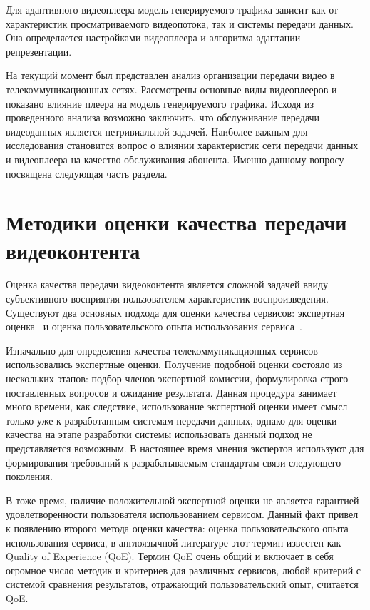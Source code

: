 Для адаптивного видеоплеера модель генерируемого трафика зависит как от характеристик просматриваемого видеопотока, так и системы передачи данных. Она определяется настройками видеоплеера и алгоритма адаптации репрезентации.

На текущий момент был представлен анализ организации передачи видео в телекоммуникационных сетях. Рассмотрены основные виды видеоплееров и показано влияние плеера на модель генерируемого трафика. Исходя из проведенного анализа возможно заключить, что обслуживание передачи видеоданных является нетривиальной задачей. Наиболее важным для исследования становится вопрос о влиянии характеристик сети передачи данных и видеоплеера на качество обслуживания абонента. Именно данному вопросу посвящена следующая часть раздела.

\section{Методики оценки качества передачи видеоконтента}
\label{chap1:VideoMOS}

Оценка качества передачи видеоконтента является сложной задачей ввиду субъективного восприятия пользователем характеристик воспроизведения. Существуют два основных подхода для оценки качества сервисов: экспертная оценка~\cite{Experts} и оценка пользовательского опыта использования сервиса~\cite{QoE}.

Изначально для определения качества телекоммуникационных сервисов использовались экспертные оценки. Получение подобной оценки состояло из нескольких этапов: подбор членов экспертной комиссии, формулировка строго поставленных вопросов и ожидание результата. Данная процедура занимает много времени, как следствие, использование экспертной оценки имеет смысл только уже к разработанным системам передачи данных, однако для оценки качества на этапе разработки системы использовать данный подход не представляется возможным. В настоящее время мнения экспертов используют для формирования требований к разрабатываемым стандартам связи следующего поколения.

В тоже время, наличие положительной экспертной оценки не является гарантией удовлетворенности пользователя использованием сервисом. Данный факт привел к появлению второго метода оценки качества: оценка пользовательского опыта использования сервиса, в англоязычной литературе этот термин известен как Quality of Experience (QoE). Термин QoE очень общий и включает в себя огромное число методик и критериев для различных сервисов, любой критерий с системой сравнения результатов, отражающий пользовательский опыт, считается QoE.

